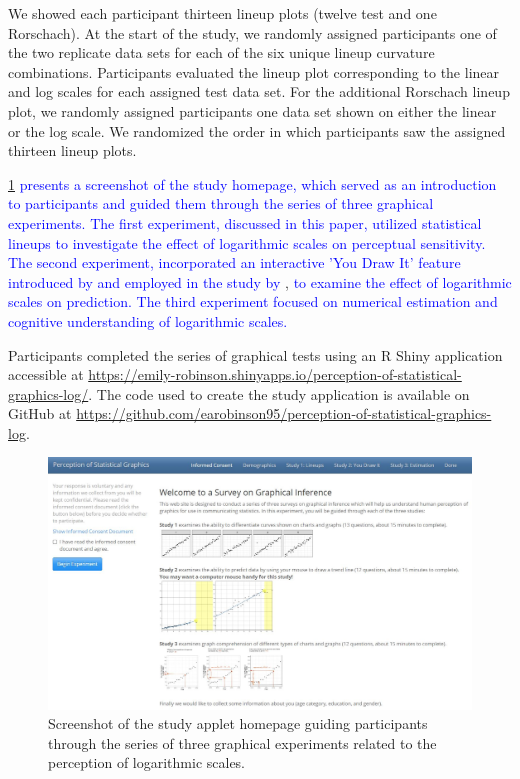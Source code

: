 \documentclass[12pt]{article}
\begin{document}
We showed each participant thirteen lineup plots (twelve test and one
Rorschach). At the start of the study, we randomly assigned participants
one of the two replicate data sets for each of the six unique lineup
curvature combinations. Participants evaluated the lineup plot
corresponding to the linear and log scales for each assigned test data
set. For the additional Rorschach lineup plot, we randomly assigned
participants one data set shown on either the linear or the log scale.
We randomized the order in which participants saw the assigned thirteen
lineup plots.

\cref{fig:study-homepage}
{\textcolor{blue}{presents a screenshot of the study homepage, which served as an introduction to participants and guided them through the series of three graphical experiments. The first experiment, discussed in this paper, utilized statistical lineups to investigate the effect of logarithmic scales on perceptual sensitivity. The second experiment, incorporated an interactive 'You Draw It' feature introduced by}}
\citet{aisch2015you} {\textcolor{blue}{and employed in the study by}}
\citet{robinson2022eye},
{\textcolor{blue}{to examine the effect of logarithmic scales on prediction. The third experiment focused on numerical estimation and cognitive understanding of logarithmic scales.}}

Participants completed the series of graphical tests using an R Shiny
application \citep{shiny_pkg} accessible at
\url{https://emily-robinson.shinyapps.io/perception-of-statistical-graphics-log/}.
The code used to create the study application is available on GitHub at
\url{https://github.com/earobinson95/perception-of-statistical-graphics-log}.

\begin{figure}[tbp]

{\centering \includegraphics[width=1\linewidth,]{images/study-homepage} 

}

\caption[Study applet homepage]{Screenshot of the study applet homepage guiding participants through the series of three graphical experiments related to the perception of logarithmic scales.}\label{fig:study-homepage}
\end{figure}
\end{document}

